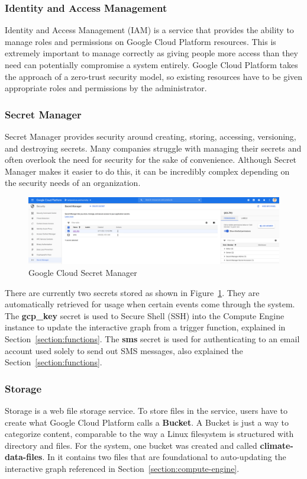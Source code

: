 \documentclass{article}
\begin{document}
\subsubsection{Identity and Access Management}
Identity and Access Management (IAM) is a service that provides the ability to manage roles and permissions on Google Cloud Platform resources. This is extremely important to manage correctly as giving people more access than they need can potentially compromise a system entirely. Google Cloud Platform takes the approach of a zero-trust security model, so existing resources have to be given appropriate roles and permissions by the administrator.

\subsubsection{Secret Manager}
Secret Manager provides security around creating, storing, accessing, versioning, and destroying secrets. Many companies struggle with managing their secrets and often overlook the need for security for the sake of convenience. Although Secret Manager makes it easier to do this, it can be incredibly complex depending on the security needs of an organization.

\begin{figure}[H]
    \center
    \includegraphics[width=\textwidth]{images/secret-manager.png}
    \caption{Google Cloud Secret Manager}
    \label{fig:secret-manager}
\end{figure}

There are currently two secrets stored as shown in Figure~\ref{fig:secret-manager}. They are automatically retrieved for usage when certain events come through the system. The \textbf{gcp\_key} secret is used to Secure Shell (SSH) into the Compute Engine instance to update the interactive graph from a trigger function, explained in Section~\ref{section:functions}. The \textbf{sms} secret is used for authenticating to an email account used solely to send out SMS messages, also explained the Section~\ref{section:functions}.

\subsubsection{Storage}
Storage is a web file storage service. To store files in the service, users have to create what Google Cloud Platform calls a \textbf{Bucket}. A Bucket is just a way to categorize content, comparable to the way a Linux filesystem is structured with directory and files. For the system, one bucket was created and called \textbf{climate-data-files}. In it contains two files that are foundational to auto-updating the interactive graph referenced in Section~\ref{section:compute-engine}.
\end{document}
